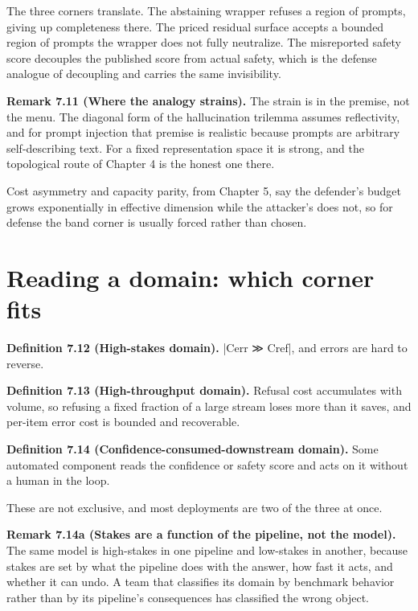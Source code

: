\documentclass{memoir}
\begin{document}
The three corners translate. The abstaining wrapper refuses a region of prompts,
giving up completeness there. The priced residual surface accepts a bounded
region of prompts the wrapper does not fully neutralize. The misreported safety
score decouples the published score from actual safety, which is the defense
analogue of decoupling and carries the same invisibility.

\textbf{Remark 7.11 (Where the analogy strains).} The strain is in the premise, not the
menu. The diagonal form of the hallucination trilemma assumes reflectivity, and
for prompt injection that premise is realistic because prompts are arbitrary
self-describing text. For a fixed representation space it is strong, and the
topological route of Chapter 4 is the honest one there.

Cost asymmetry and capacity parity, from Chapter 5, say the defender's budget
grows exponentially in effective dimension while the attacker's does not, so for
defense the band corner is usually forced rather than chosen.



\section{Reading a domain: which corner fits}\label{Two--Schemas--of--Impossibility-005F-005F-005F--Machine--Checked--Limits--of--Trustworthy--Machine--Learning-005F-005F-005F--and--Why--They--Tighten--with--Capability----What--It--Means--for--AI--Safety----Reading--a--domain-005F-005F-005F--which--corner--fits}

\textbf{Definition 7.12 (High-stakes domain).} \LeanVerb|Cerr ≫ Cref|, and errors are hard to
reverse.

\textbf{Definition 7.13 (High-throughput domain).} Refusal cost accumulates with volume, so
refusing a fixed fraction of a large stream loses more than it saves, and
per-item error cost is bounded and recoverable.

\textbf{Definition 7.14 (Confidence-consumed-downstream domain).} Some automated component
reads the confidence or safety score and acts on it without a human in the loop.

These are not exclusive, and most deployments are two of the three at once.

\textbf{Remark 7.14a (Stakes are a function of the pipeline, not the model).} The same model
is high-stakes in one pipeline and low-stakes in another, because stakes are set
by what the pipeline does with the answer, how fast it acts, and whether it can
undo. A team that classifies its domain by benchmark behavior rather than by its
pipeline's consequences has classified the wrong object.
\end{document}
